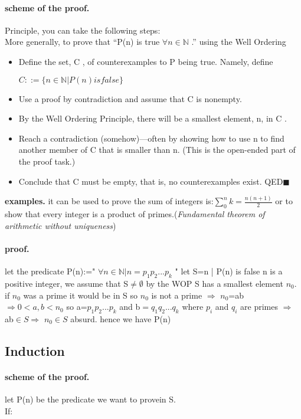 \documentclass[10pt]{article}
\begin{document}
			\paragraph{scheme of the proof. }
				Principle, you can take the following steps:\\
				More generally, to prove that “P(n) is true $\forall n \in \mathbb{N}$ .” using the Well Ordering
			\begin{itemize}
			
				\item Define the set, C , of counterexamples to P being true. Namely, define \begin{center}$C ::= \{n \in \mathbb{N} | P(n) is false \}$\end{center}
				\item Use a proof by contradiction and assume that C is nonempty.
				\item By the Well Ordering Principle, there will be a smallest element, n, in C .
				\item Reach a contradiction (somehow)—often by showing how to use n to find another member of C that is smaller than n. (This is the open-ended part of the proof task.)
				\item Conclude that C must be empty, that is, no counterexamples exist. QED$\blacksquare$
			\end{itemize}
			\textbf{examples.} it can be used to prove the sum of integers is:$\sum_{0}^{n} k =\frac{n(n+1)}{2}$
			 or to show that every integer is a product of primes.(\emph{Fundamental theorem of arithmetic without uniqueness})
			 \paragraph{proof.} 
				 let the predicate P(n):=" $\forall n \in \mathbb{N} | n=p_{1}p_{2} ... p_{k}$ "
				let S={n | P(n) is false}
				n is a positive integer, we assume that S$\neq\emptyset$ by the WOP S has a smallest element $n_{0}$.
				 if $n_{0}$ was a prime it would be in S so $n_{0}$ is not a prime $\Rightarrow$ $n_{0}$=ab
				 $\Rightarrow 0 < a,b < n_{0}$ so a=$p_{1}p_{2} ... p_{k}$ and b$=q_{1}q_{2} ... q_{k}$
				  where $p_{i}$ and $q_{i}$ are primes
				 $ \Rightarrow $ ab$ \in S $$ \Rightarrow $ $ n_{0}\in S $ absurd.
				 hence we have P(n)
		 \subsection{Induction}
			 \paragraph{scheme of the proof.}
			 let P(n) be the predicate we want to provein S.\\If:\\
			
\end{document}
